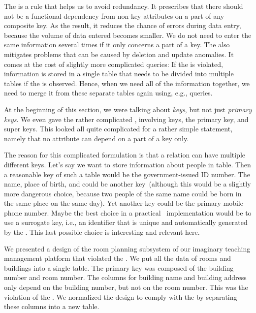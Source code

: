 %
The  is a rule that helps us to avoid redundancy.
It prescribes that there should not be a functional dependency from non-key attributes on a part of any composite key.
As the result, it reduces the chance of errors during data entry, because the volume of data entered becomes smaller.
We do not need to enter the same information several times if it only concerns a part of a key.
The  also mitigates problems that can be caused by deletion and update anomalies.
It comes at the cost of slightly more complicated queries:
If the  is violated, information is stored in a single table that needs to be divided into multiple tables if the  is observed.
Hence, when we need all of the information together, we need to merge it from these separate tables again using, e.g.,  queries.

At the beginning of this section,  we were talking about \emph{keys}, but not just \emph{primary keys}.
We even gave the rather complicated , involving keys, the primary key, and super keys.
This looked all quite complicated for a rather simple statement, namely that no attribute can depend on a part of a key only.

The reason for this complicated formulation is that a relation can have multiple different keys.
Let's say we want to store information about people in table.
Then a reasonable key of such a table would be the government-issued ID number.
The name, place of birth, and  could be another key~(although this would be a slightly more dangerous choice, because two people of the same name could be born in the same place on the same day).
Yet another key could be the primary mobile phone number.
Maybe the best choice in a practical \db\ implementation would be to use a surrogate key, i.e., an identifier
that is unique and automatically generated by the \dbms.
This last possible choice is interesting and relevant here.

We presented a design of the room planning subsystem of our imaginary teaching management platform that violated the .
We put all the data of rooms and buildings into a single table.
The primary key was composed of the building number and room number.
The columns for building name and building address only depend on the building number, but not on the room number.
This was the violation of the .
We normalized the design to comply with the  by separating these columns into a new table.

